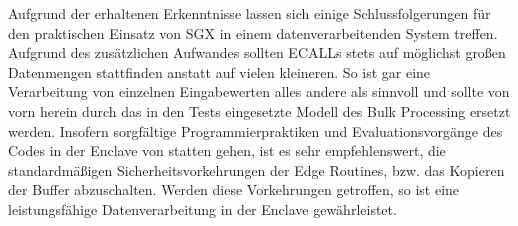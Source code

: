 Aufgrund der erhaltenen Erkenntnisse lassen sich einige Schlussfolgerungen für den praktischen Einsatz von SGX in einem datenverarbeitenden System treffen. Aufgrund des zusätzlichen Aufwandes sollten ECALLs stets auf möglichst großen Datenmengen stattfinden anstatt auf vielen kleineren. So ist gar eine Verarbeitung von einzelnen Eingabewerten alles andere als sinnvoll und sollte von vorn herein durch das in den Tests eingesetzte Modell des Bulk Processing ersetzt werden. Insofern sorgfältige Programmierpraktiken und Evaluationsvorgänge des Codes in der Enclave von statten gehen, ist es sehr empfehlenswert, die standardmäßigen Sicherheitsvorkehrungen der Edge Routines, bzw. das Kopieren der Buffer abzuschalten. Werden diese Vorkehrungen getroffen, so ist eine leistungsfähige Datenverarbeitung in der Enclave gewährleistet.